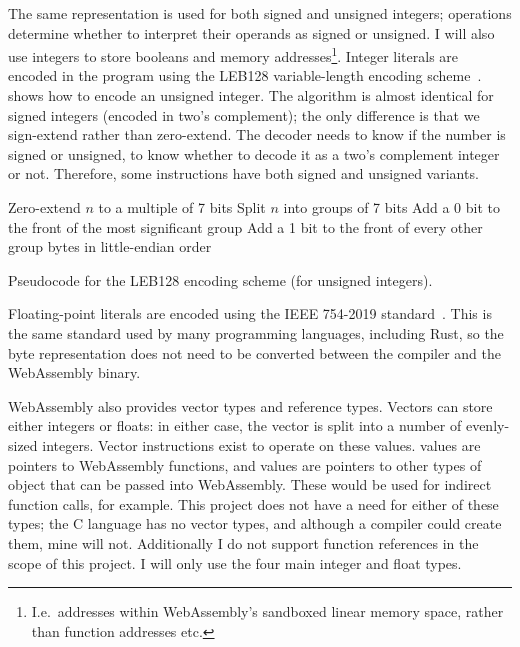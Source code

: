 \documentclass[00-main.tex]{subfiles}
\begin{document}
The same representation is used for both signed and unsigned integers; operations determine whether to interpret their operands as signed or unsigned.
I will also use integers to store booleans and memory addresses\footnote{I.e.\ addresses within WebAssembly's sandboxed linear memory space, rather than function addresses etc.}.
Integer literals are encoded in the program using the LEB128 variable-length encoding scheme~.
 shows how to encode an unsigned integer.
The algorithm is almost identical for signed integers (encoded in two's complement); the only difference is that we sign-extend rather than zero-extend.
The decoder needs to know if the number is signed or unsigned, to know whether to decode it as a two's complement integer or not.
Therefore, some instructions have both signed and unsigned variants.

\begin{listing}[t]
  \begin{PseudocodeListing}
      \State Zero-extend $n$ to a multiple of 7 bits
      \State Split $n$ into groups of 7 bits
      \State Add a 0 bit to the front of the most significant group
      \State Add a 1 bit to the front of every other group
      \State \Return bytes in little-endian order
    \EndFunction
  \end{PseudocodeListing}
  \caption{Pseudocode for the LEB128 encoding scheme (for unsigned integers).}
  \label{lst:leb128 pseudocode}
\end{listing}

Floating-point literals are encoded using the IEEE 754-2019 standard~. %
This is the same standard used by many programming languages, including Rust, so the byte representation does not need to be converted between the compiler and the WebAssembly binary.

WebAssembly also provides vector types and reference types.
Vectors can store either integers or floats: in either case, the vector is split into a number of evenly-sized integers.
Vector instructions exist to operate on these values.
 values are pointers to WebAssembly functions, and  values are pointers to other types of object that can be passed into WebAssembly. These would be used for indirect function calls, for example.
This project does not have a need for either of these types; the C language has no vector types, and although a compiler could create them, mine will not.
Additionally I do not support function references in the scope of this project.
I will only use the four main integer and float types.
\end{document}
